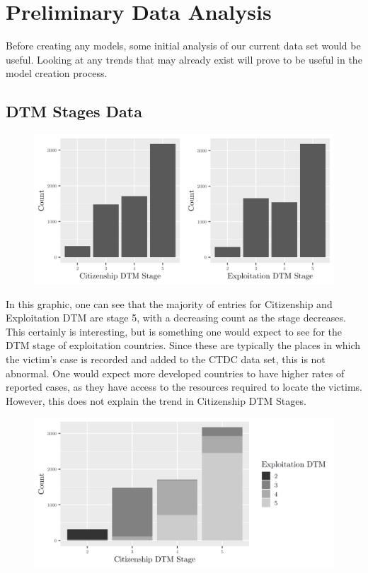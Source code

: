 \documentclass{article} %
\begin{document}
\newpage
\section{Preliminary Data Analysis}

Before creating any models, some initial analysis of our current data set would be useful. Looking at any trends that may already exist will prove to be useful in the model creation process.

\subsection{DTM Stages Data}

\FloatBarrier
\begin{figure}[H]
	\includegraphics[width=\textwidth]{DTMStagesBarplot}
\end{figure}
\FloatBarrier

In this graphic, one can see that the majority of entries for Citizenship and Exploitation DTM are stage 5, with a decreasing count as the stage decreases. This certainly is interesting, but is something one would expect to see for the DTM stage of exploitation countries. Since these are typically the places in which the victim's case is recorded and added to the CTDC data set, this is not abnormal. One would expect more developed countries to have higher rates of reported cases, as they have access to the resources required to locate the victims. However, this does not explain the trend in Citizenship DTM Stages.

\FloatBarrier
\begin{figure}[H]
	\includegraphics[width = \textwidth]{DTMStage1}
\end{figure}
\FloatBarrier
\end{document}
